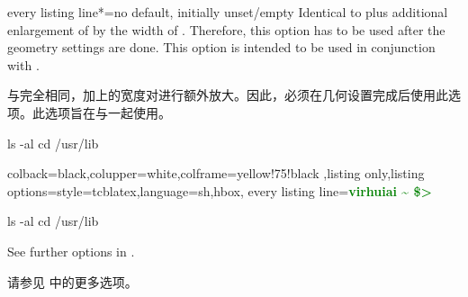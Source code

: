 \begin{docTcbKey}{every listing line*}{=}{no default, initially unset/empty}
Identical to  plus additional enlargement
of  by the width of . Therefore, this
option has to be used after the geometry settings are done.
This option is intended to be used in conjunction with .

与完全相同，加上的宽度对进行额外放大。因此，必须在几何设置完成后使用此选项。此选项旨在与一起使用。
\begin{dispExample}

\begin{commandshell}
ls -al
cd /usr/lib
\end{commandshell}
\end{dispExample}

\begin{dispExample}
%
{colback=black,colupper=white,colframe=yellow!75!black%
,listing only,listing options={style=tcblatex,language=sh},hbox,
every listing line={\textcolor{green}{\small\ttfamily\bfseries virhuiai \textasciitilde{} \$> }}}

\begin{commandshell}
ls -al
cd /usr/lib
\end{commandshell}
\end{dispExample}
\end{docTcbKey}

See further options in .

请参见  中的更多选项。
